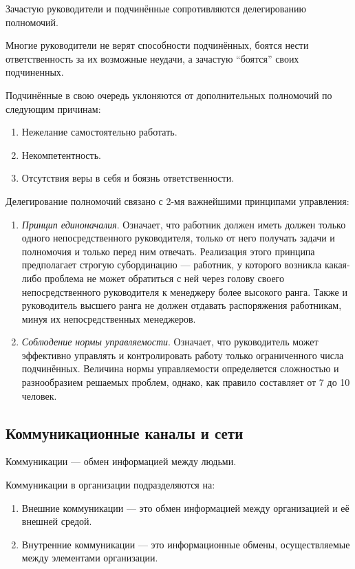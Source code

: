 \documentclass[12pt, russian, oneside, article]{ncc}
\begin{document}
Зачастую руководители и подчинённые сопротивляются делегированию полномочий.

Многие руководители не верят способности подчинённых, боятся нести ответственность за их возможные неудачи, а зачастую ``боятся'' своих подчиненных.

Подчинённые в свою очередь уклоняются от дополнительных полномочий по следующим причинам:
\begin{enumerate}
\item Нежелание самостоятельно работать.
\item Некомпетентность.
\item Отсутствия веры в себя и боязнь ответственности.
\end{enumerate}

Делегирование полномочий связано с 2-мя важнейшими принципами управления:
\begin{enumerate}
\item \emph{Принцип единоначалия}. Означает, что работник должен иметь должен только одного непосредственного руководителя, только от него получать задачи и полномочия и только перед ним отвечать. Реализация этого принципа предполагает строгую субординацию --- работник, у которого возникла какая-либо проблема не может обратиться с ней через голову своего непосредственного руководителя к менеджеру более высокого ранга. Также и руководитель высшего ранга не должен отдавать распоряжения работникам, минуя их непосредственных менеджеров.
\item \emph{Соблюдение нормы управляемости}. Означает, что руководитель может эффективно управлять и контролировать работу только ограниченного числа подчинённых. Величина нормы управляемости определяется сложностью и разнообразием решаемых проблем, однако, как правило составляет от 7 до 10 человек.
\end{enumerate}
\subsection{Коммуникационные каналы и сети}
\label{sec-5_6}


Коммуникации --- обмен информацией между людьми.

Коммуникации в организации подразделяются на:
\begin{enumerate}
\item Внешние коммуникации --- это обмен информацией между организацией и её внешней средой.
\item Внутренние коммуникации --- это информационные обмены, осуществляемые между элементами организации.
\end{enumerate}
\end{document}

